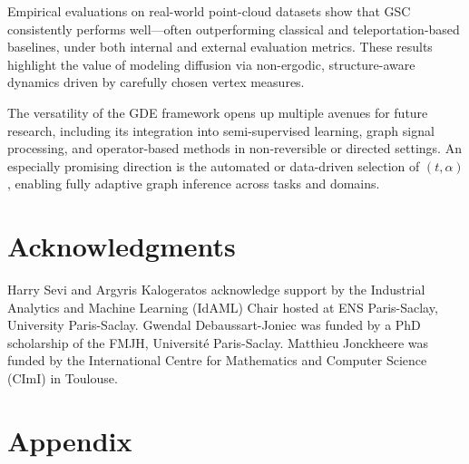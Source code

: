 \documentclass[10pt]{article} %
\newcommand{\GSC}{GSC\xspace}
\begin{document}
Empirical evaluations on real-world point-cloud datasets show that \GSC consistently performs well—often outperforming classical and teleportation-based baselines, under both internal and external evaluation metrics. These results highlight the value of modeling diffusion via non-ergodic, structure-aware dynamics driven by carefully chosen vertex measures.

The versatility of the GDE framework opens up multiple avenues for future research, including its integration into semi-supervised learning, graph signal processing, and operator-based methods in non-reversible or directed settings. An especially promising direction is the automated or data-driven selection of $(t, \alpha)$, enabling fully adaptive graph inference across tasks and domains.


\section*{Acknowledgments}
Harry Sevi and Argyris Kalogeratos acknowledge support by the Industrial Analytics and Machine Learning (IdAML) Chair hosted at ENS Paris-Saclay, University Paris-Saclay. Gwendal Debaussart-Joniec was funded by a PhD scholarship of the FMJH, Université Paris-Saclay. Matthieu Jonckheere was funded by the International Centre for Mathematics and Computer Science (CImI) in Toulouse.

%



\appendix

\section{Appendix}

%
\end{document}
